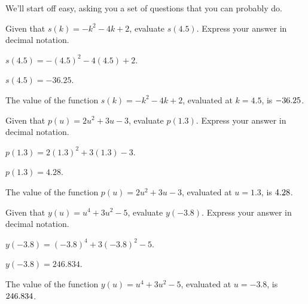 

We'll start off easy, asking you a set of questions that you can
probably do.


\begin{shuffle}
\begin{exercise}
Given that $s(k)=-k^2-4 k+2$, evaluate $s(4.5)$. Express your answer in decimal notation.
\begin{solution}
\begin{hint}
$s(4.5)=-(4.5)^2-4 (4.5)+2$.
\end{hint}
\begin{hint}
$s(4.5)=-36.25$.
\end{hint}
The value of the function $s(k)=-k^2-4 k+2$, evaluated at $k=4.5$, is ${-36.25}$.
\end{solution}
\end{exercise}

\begin{exercise}
Given that $p(u)=2 u^2+3 u-3$, evaluate $p(1.3)$. Express your answer in decimal notation.
\begin{solution}
\begin{hint}
$p(1.3)=2 (1.3)^2+3 (1.3)-3$.
\end{hint}
\begin{hint}
$p(1.3)=4.28$.
\end{hint}
The value of the function $p(u)=2 u^2+3 u-3$, evaluated at $u=1.3$, is ${4.28}$.
\end{solution}
\end{exercise}

\begin{exercise}
Given that $y(u)=u^4+3 u^2-5$, evaluate $y(-3.8)$. Express your answer in decimal notation.
\begin{solution}
\begin{hint}
$y(-3.8)=(-3.8)^4+3 (-3.8)^2-5$.
\end{hint}
\begin{hint}
$y(-3.8)=246.834$.
\end{hint}
The value of the function $y(u)=u^4+3 u^2-5$, evaluated at $u=-3.8$, is ${246.834}$.
\end{solution}
\end{exercise}


\end{shuffle}
